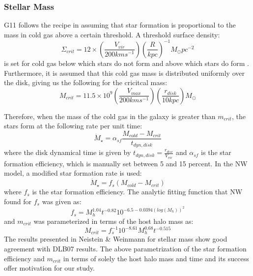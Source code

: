 \documentclass[a4paper,fleqn,usenatbib]{mnras}
\begin{document}
\subsubsection{Stellar Mass} \label{mdf: db_sam_stellar}
\par G11 follows the \citet{kauffmann1996disc} recipe in assuming that star formation is proportional to the mass in cold gas above a certain threshold. A threshold surface density: \begin{equation} \Sigma _{crit} = 12 \times \left(\frac{V_{vir}}{200kms^{-1}}\right) \left(\frac{R}{kpc}\right)^{-1} M_{\odot} pc^{-2} \end{equation} is set for cold gas below which stars do not form and above which stars do form \citep{kennicutt1998global}. Furthermore, it is assumed that this cold gas mass is distributed uniformly over the disk, giving us the following for the cricitcal mass:
\begin{equation}
M_{crit} = 11.5 \times 10^9 \left(\frac{V_{max}}{200kms^{-1}}\right)\left(\frac{r_{disk}}{10 kpc}\right) M_{\odot}
\end{equation} 
\par Therefore, when the mass of the cold gas in the galaxy is greater than $m_{crit}$, the stars form at the following rate per unit time:
\begin{equation}
\dot M_{\star} = \alpha _ {sf} \frac{M_{cold} - M_{crit}}{t_{dyn, disk}}
\end{equation} 
where the disk dynamical time is given by $t_{dyn,disk}=\frac{r_{disc}}{V_{vir}}$    and $\alpha _ {sf}$ is the star formation efficiency, which is manually set between 5 and 15 percent. In the NW model, a modified star formation rate is used:
\begin{equation}
\dot M_{\star} = f_{s} (M_{cold} - M_{crit}) 
\end{equation}
where $f_s$ is the star formation efficiency. The analytic fitting function that NW found for $f_s$ was given as: 
\begin{equation}
f_s = M_h ^ {1.04} t^{-0.82} 10^{-6.5-0.0394(log(M_h))^2}
\end{equation}
and $m_{crit}$ was parameterized in terms of the host halo mass as: 
\begin{equation}
M_{crit} = f_s ^ {-1} 10^{-8.61} M_h ^ {0.68} t^{-0.515}
\end{equation}
The results presented in Neistein \& Weinmann for stellar mass show good agreement with DLB07 results. The above parametrization of the star formation efficiency and $m_{crit}$ in terms of solely the host halo mass and time and its success offer motivation for our study.
\end{document}
